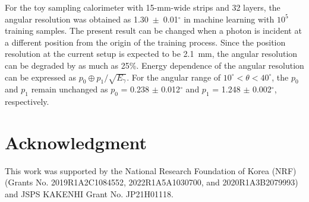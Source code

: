 \documentclass[12pt,times,draftclsnofoot,a4paper]{elsarticle}
\begin{document}
For the toy sampling calorimeter with 15-mm-wide strips and 32 layers, the angular resolution was obtained as 1.30~$\pm$~0.01$^{\circ}$ in machine learning with $10^{5}$ training samples. The present result can be changed when a photon is incident at a different position from the origin of the training process. Since the position resolution at the current setup is expected to be 2.1~mm, the angular resolution can be degraded by as much as 25\%. Energy dependence of the angular resolution can be expressed as $p_{0} \oplus p_{1}/\sqrt{E_{\gamma}}$. For the angular range of $10^{\circ}<\theta<40^{\circ}$, the $p_{0}$ and $p_{1}$ remain unchanged as $p_{0}$ = 0.238 $\pm$ 0.012$^{\circ}$ and $p_{1}$ = 1.248 $\pm$ 0.002$^{\circ}$, respectively.

\label{sec:con}


\section*{Acknowledgment}
This work was supported by the National Research Foundation of Korea (NRF) 
(Grants No. 2019R1A2C1084552, 2022R1A5A1030700, and 2020R1A3B2079993) and JSPS KAKENHI Grant No. JP21H01118.
\end{document}
